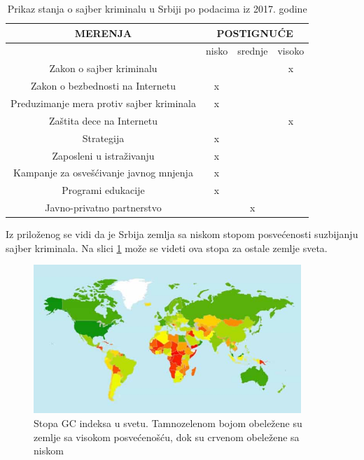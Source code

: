 \documentclass[a4paper]{article}
\theoremstyle{break}
\begin{document}
{\begin{table}[h]
\begin{center}
\centering
 \begin{tabular}{|c|c|c|c|}
 \hline MERENJA & \multicolumn{3}{|c|}{POSTIGNUĆE} \\
 \hline	 & nisko & srednje & visoko\\
 \hline  Zakon o sajber kriminalu & & &x\\
 \hline Zakon o bezbednosti na Internetu &x & &\\
 \hline Preduzimanje mera protiv sajber kriminala &x & &\\
 \hline Zaštita dece na Internetu & & &x\\
 \hline Strategija &x & &\\
 \hline Zaposleni u istraživanju &x & &\\
 \hline Kampanje za osvešćivanje javnog mnjenja &x & &\\
 \hline Programi edukacije &x & &\\
 \hline Javno-privatno partnerstvo & &x &\\
 \hline 
 \end{tabular}
 \caption{Prikaz stanja o sajber kriminalu u Srbiji po podacima iz 2017. godine}
 \label{tab:tabela1} 
 \end{center}
\end{table}

Iz priloženog se vidi da je Srbija zemlja sa niskom stopom posvećenosti suzbijanju sajber kriminala. Na slici \ref{fig:svet} može se videti ova stopa za ostale zemlje sveta.

\begin{figure}[h!]
\begin{center}
\includegraphics[height=0.37\textwidth, width=0.9\textwidth]{itu_worldmap.jpg}
\end{center}
\caption{Stopa GC indeksa u svetu. Tamnozelenom bojom obeležene su zemlje sa visokom posvećenošću, dok su crvenom obeležene sa niskom}
\label{fig:svet}
\end{figure}

}
\end{document}

